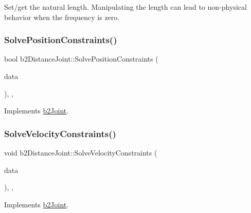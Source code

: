 Set/get the natural length. Manipulating the length can lead to non-\/physical behavior when the frequency is zero. \mbox{\label{classb2_distance_joint_a431d12fac5ee9f6a5637321ee28119bc}} 
\subsubsection{\texorpdfstring{SolvePositionConstraints()}{SolvePositionConstraints()}}
{\footnotesize\ttfamily bool b2\+Distance\+Joint\+::\+Solve\+Position\+Constraints (\begin{DoxyParamCaption}\item[{const \mbox{\hyperlink{structb2_solver_data}{b2\+Solver\+Data}} \&}]{data }\end{DoxyParamCaption})\hspace{0.3cm}{\ttfamily [override]}, {\ttfamily [protected]}, {\ttfamily [virtual]}}



Implements \mbox{\hyperlink{classb2_joint_af767ac9aa494bd15cdf83dfe3e487d9c}{b2\+Joint}}.

\mbox{\label{classb2_distance_joint_ad42429151fb979a230f103d684d2a42c}} 
\subsubsection{\texorpdfstring{SolveVelocityConstraints()}{SolveVelocityConstraints()}}
{\footnotesize\ttfamily void b2\+Distance\+Joint\+::\+Solve\+Velocity\+Constraints (\begin{DoxyParamCaption}\item[{const \mbox{\hyperlink{structb2_solver_data}{b2\+Solver\+Data}} \&}]{data }\end{DoxyParamCaption})\hspace{0.3cm}{\ttfamily [override]}, {\ttfamily [protected]}, {\ttfamily [virtual]}}



Implements \mbox{\hyperlink{classb2_joint_ad302c8d02efcfe934158de0dc429348d}{b2\+Joint}}.



